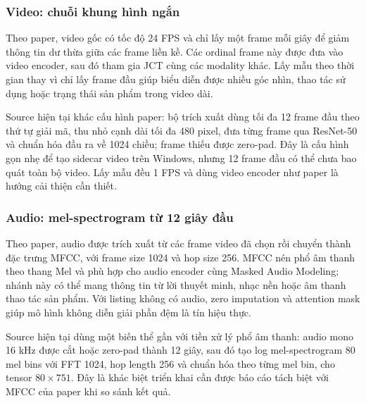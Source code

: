 \documentclass[10pt,conference]{IEEEtran}
\begin{document}
\subsubsection{Video: chuỗi khung hình ngắn}

Theo paper, video gốc có tốc độ 24 FPS và chỉ lấy một frame mỗi giây để giảm thông tin dư thừa giữa các frame liền kề. Các ordinal frame này được đưa vào video encoder, sau đó tham gia JCT cùng các modality khác. Lấy mẫu theo thời gian thay vì chỉ lấy frame đầu giúp biểu diễn được nhiều góc nhìn, thao tác sử dụng hoặc trạng thái sản phẩm trong video dài.

Source hiện tại khác cấu hình paper: bộ trích xuất dùng tối đa 12 frame đầu theo thứ tự giải mã, thu nhỏ cạnh dài tối đa 480 pixel, đưa từng frame qua ResNet-50 và chuẩn hóa đầu ra về 1024 chiều; frame thiếu được zero-pad. Đây là cấu hình gọn nhẹ để tạo sidecar video trên Windows, nhưng 12 frame đầu có thể chưa bao quát toàn bộ video. Lấy mẫu đều 1 FPS và dùng video encoder như paper là hướng cải thiện cần thiết.

\subsubsection{Audio: mel-spectrogram từ 12 giây đầu}

Theo paper, audio được trích xuất từ các frame video đã chọn rồi chuyển thành đặc trưng MFCC, với frame size 1024 và hop size 256. MFCC nén phổ âm thanh theo thang Mel và phù hợp cho audio encoder cùng Masked Audio Modeling; nhánh này có thể mang thông tin từ lời thuyết minh, nhạc nền hoặc âm thanh thao tác sản phẩm. Với listing không có audio, zero imputation và attention mask giúp mô hình không diễn giải phần đệm là tín hiệu thực.

Source hiện tại dùng một biến thể gần với tiền xử lý phổ âm thanh: audio mono 16 kHz được cắt hoặc zero-pad thành 12 giây, sau đó tạo log mel-spectrogram 80 mel bins với FFT 1024, hop length 256 và chuẩn hóa theo từng mel bin, cho tensor $80\times751$. Đây là khác biệt triển khai cần được báo cáo tách biệt với MFCC của paper khi so sánh kết quả.
\end{document}
